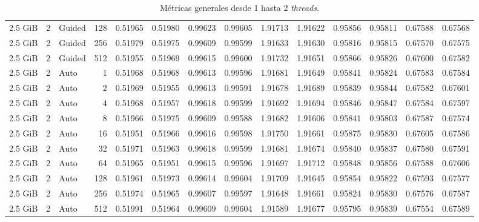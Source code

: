\begin{table}[H]
\begin{adjustbox}{width=\textwidth, keepaspectratio}
\begin{tabular}{rrlrrrrrrrrrrr}
                    2.5 GiB & 2 & Guided & 128 & 0.51965 & 0.51980 & 0.99623 & 0.99605 & 1.91713 & 1.91622 & 0.95856 & 0.95811 & 0.67588 & 0.67568 \\
                    2.5 GiB & 2 & Guided & 256 & 0.51979 & 0.51975 & 0.99609 & 0.99599 & 1.91633 & 1.91630 & 0.95816 & 0.95815 & 0.67570 & 0.67575 \\
                    2.5 GiB & 2 & Guided & 512 & 0.51955 & 0.51969 & 0.99615 & 0.99600 & 1.91732 & 1.91651 & 0.95866 & 0.95826 & 0.67600 & 0.67582 \\
                    2.5 GiB & 2 & Auto & 1 & 0.51968 & 0.51968 & 0.99613 & 0.99596 & 1.91681 & 1.91649 & 0.95841 & 0.95824 & 0.67583 & 0.67584 \\
                    2.5 GiB & 2 & Auto & 2 & 0.51969 & 0.51955 & 0.99613 & 0.99591 & 1.91678 & 1.91689 & 0.95839 & 0.95844 & 0.67582 & 0.67601 \\
                    2.5 GiB & 2 & Auto & 4 & 0.51968 & 0.51957 & 0.99618 & 0.99599 & 1.91692 & 1.91694 & 0.95846 & 0.95847 & 0.67584 & 0.67597 \\
                    2.5 GiB & 2 & Auto & 8 & 0.51966 & 0.51975 & 0.99609 & 0.99588 & 1.91682 & 1.91606 & 0.95841 & 0.95803 & 0.67587 & 0.67574 \\
                    2.5 GiB & 2 & Auto & 16 & 0.51951 & 0.51966 & 0.99616 & 0.99598 & 1.91750 & 1.91661 & 0.95875 & 0.95830 & 0.67605 & 0.67586 \\
                    2.5 GiB & 2 & Auto & 32 & 0.51971 & 0.51963 & 0.99618 & 0.99599 & 1.91681 & 1.91674 & 0.95840 & 0.95837 & 0.67580 & 0.67591 \\
                    2.5 GiB & 2 & Auto & 64 & 0.51965 & 0.51951 & 0.99615 & 0.99596 & 1.91697 & 1.91712 & 0.95848 & 0.95856 & 0.67588 & 0.67606 \\
                    2.5 GiB & 2 & Auto & 128 & 0.51961 & 0.51973 & 0.99614 & 0.99604 & 1.91709 & 1.91645 & 0.95854 & 0.95822 & 0.67593 & 0.67577 \\
                    2.5 GiB & 2 & Auto & 256 & 0.51974 & 0.51965 & 0.99607 & 0.99597 & 1.91648 & 1.91661 & 0.95824 & 0.95830 & 0.67576 & 0.67587 \\
                    2.5 GiB & 2 & Auto & 512 & 0.51991 & 0.51964 & 0.99609 & 0.99604 & 1.91589 & 1.91677 & 0.95795 & 0.95839 & 0.67554 & 0.67589 \\
                    \bottomrule
                \end{tabular}
            \end{adjustbox}
            \caption{Métricas generales desde 1 hasta 2 \textit{threads}.}
            \label{tab:distance_metrics_1}
        \end{table}

